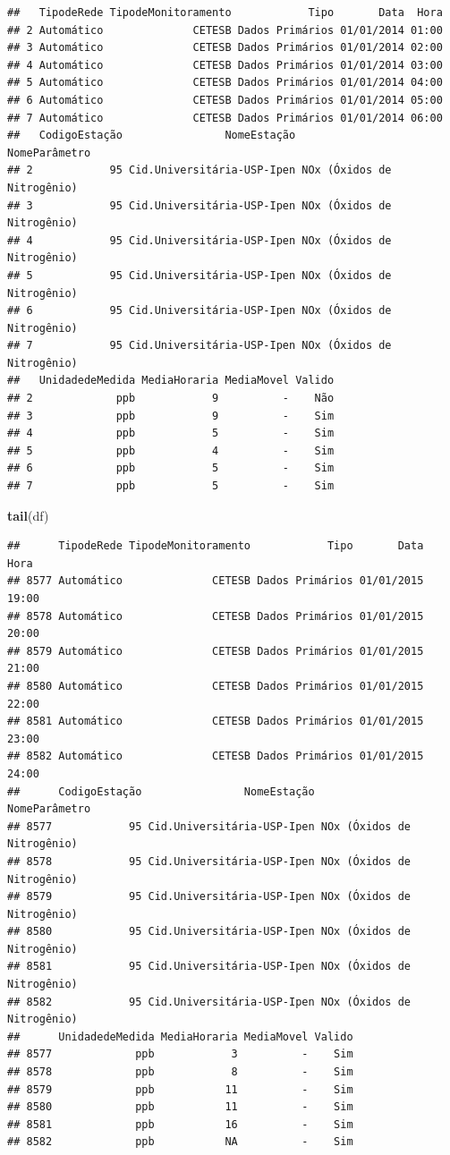 \documentclass[]{book}
\newenvironment{Shaded}{\begin{snugshade}}{\end{snugshade}}
\newcommand{\KeywordTok}[1]{\textcolor[rgb]{0.13,0.29,0.53}{\textbf{#1}}}
\newcommand{\NormalTok}[1]{#1}
\theoremstyle{definition}
\theoremstyle{definition}
\theoremstyle{definition}
\theoremstyle{remark}
\begin{document}
\begin{verbatim}
##   TipodeRede TipodeMonitoramento            Tipo       Data  Hora
## 2 Automático              CETESB Dados Primários 01/01/2014 01:00
## 3 Automático              CETESB Dados Primários 01/01/2014 02:00
## 4 Automático              CETESB Dados Primários 01/01/2014 03:00
## 5 Automático              CETESB Dados Primários 01/01/2014 04:00
## 6 Automático              CETESB Dados Primários 01/01/2014 05:00
## 7 Automático              CETESB Dados Primários 01/01/2014 06:00
##   CodigoEstação                NomeEstação              NomeParâmetro
## 2            95 Cid.Universitária-USP-Ipen NOx (Óxidos de Nitrogênio)
## 3            95 Cid.Universitária-USP-Ipen NOx (Óxidos de Nitrogênio)
## 4            95 Cid.Universitária-USP-Ipen NOx (Óxidos de Nitrogênio)
## 5            95 Cid.Universitária-USP-Ipen NOx (Óxidos de Nitrogênio)
## 6            95 Cid.Universitária-USP-Ipen NOx (Óxidos de Nitrogênio)
## 7            95 Cid.Universitária-USP-Ipen NOx (Óxidos de Nitrogênio)
##   UnidadedeMedida MediaHoraria MediaMovel Valido
## 2             ppb            9          -    Não
## 3             ppb            9          -    Sim
## 4             ppb            5          -    Sim
## 5             ppb            4          -    Sim
## 6             ppb            5          -    Sim
## 7             ppb            5          -    Sim
\end{verbatim}

\begin{Shaded}
\begin{Highlighting}[]
\KeywordTok{tail}\NormalTok{(df)}
\end{Highlighting}
\end{Shaded}

\begin{verbatim}
##      TipodeRede TipodeMonitoramento            Tipo       Data  Hora
## 8577 Automático              CETESB Dados Primários 01/01/2015 19:00
## 8578 Automático              CETESB Dados Primários 01/01/2015 20:00
## 8579 Automático              CETESB Dados Primários 01/01/2015 21:00
## 8580 Automático              CETESB Dados Primários 01/01/2015 22:00
## 8581 Automático              CETESB Dados Primários 01/01/2015 23:00
## 8582 Automático              CETESB Dados Primários 01/01/2015 24:00
##      CodigoEstação                NomeEstação              NomeParâmetro
## 8577            95 Cid.Universitária-USP-Ipen NOx (Óxidos de Nitrogênio)
## 8578            95 Cid.Universitária-USP-Ipen NOx (Óxidos de Nitrogênio)
## 8579            95 Cid.Universitária-USP-Ipen NOx (Óxidos de Nitrogênio)
## 8580            95 Cid.Universitária-USP-Ipen NOx (Óxidos de Nitrogênio)
## 8581            95 Cid.Universitária-USP-Ipen NOx (Óxidos de Nitrogênio)
## 8582            95 Cid.Universitária-USP-Ipen NOx (Óxidos de Nitrogênio)
##      UnidadedeMedida MediaHoraria MediaMovel Valido
## 8577             ppb            3          -    Sim
## 8578             ppb            8          -    Sim
## 8579             ppb           11          -    Sim
## 8580             ppb           11          -    Sim
## 8581             ppb           16          -    Sim
## 8582             ppb           NA          -    Sim
\end{verbatim}
\end{document}
